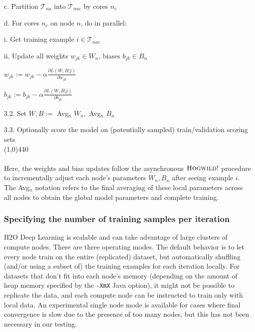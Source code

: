 \hspace{2cm}  c. Partition $\mathcal{T}_{na}$ into $\mathcal{T}_{nac}$ by cores $n_c$

\hspace{2cm}  d. For cores $n_c$ on node $n$, do in parallel:

\hspace{3cm}  i. Get training example $i \in \mathcal{T}_{nac}$

\hspace{3cm}  ii. Update all weights $w_{jk} \in W_n$, biases $b_{jk} \in B_n$

\hspace{4cm}  $w_{jk} := w_{jk} - \alpha \frac{\partial L(W,B | j)}{\partial w_{jk}}$

\hspace{4cm} $b_{jk} := b_{jk} - \alpha \frac{\partial L(W,B | j)}{\partial b_{jk}}$

\hspace{1cm} 3.2. Set $W,B := $ Avg$_n$ $W_n,$ $ $Avg$_n$ $B_n$

\hspace{1cm} 3.3. Optionally score the model on (potentially sampled) train/validation scoring sets
\\
\line(1,0){440}
\\
\\
Here, the weights and bias updates follow the asynchronous  $\textsc{Hogwild!}$ procedure to incrementally adjust each node's parameters $W_n,B_n$ after seeing example $i$. The Avg$_n$ notation refers to the final averaging of these local parameters across all nodes to obtain the global model parameters and complete training.

\subsubsection{Specifying the number of training samples per iteration} 
\label{sssec:TrainSamplesPerIter}
H2O Deep Learning is scalable and can take advantage of large clusters of compute nodes. There are three operating modes. The default behavior is to let every node train on the entire (replicated) dataset, but automatically  shuffling (and/or using a subset of) the training examples for each iteration locally. For datasets that don't fit into each node's memory (depending on the amount of heap memory specified by the \texttt{-XmX} Java %
option), it might not be possible to replicate the data, and each compute node can be instructed to train only with local data. An experimental single node mode is available for cases where final convergence is slow due to the presence of too many nodes, but this has not been necessary in our testing.

